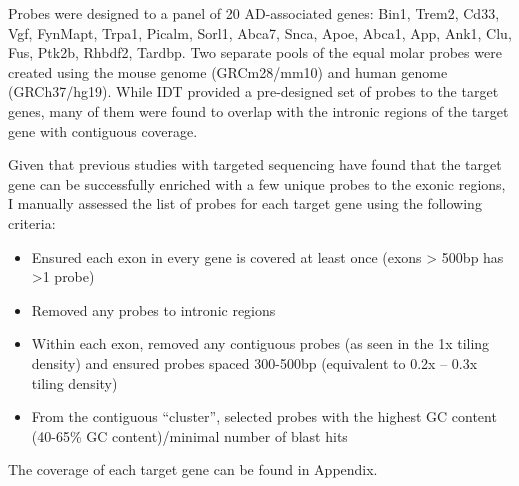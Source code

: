 
Probes were designed to a panel of 20 AD-associated genes: Bin1, Trem2, Cd33, Vgf, FynMapt, Trpa1, Picalm, Sorl1, Abca7, Snca, Apoe, Abca1, App, Ank1, Clu, Fus, Ptk2b, Rhbdf2, Tardbp. Two separate pools of the equal molar probes were created using the mouse genome (GRCm28/mm10) and human genome (GRCh37/hg19). While IDT provided a pre-designed set of probes to the target genes, many of them were found to overlap with the intronic regions of the target gene with contiguous coverage. 

Given that previous studies with targeted sequencing have found that the target gene can be successfully enriched with a few unique probes to the exonic regions, I manually assessed the list of probes for each target gene using the following criteria:
\begin{itemize}
	\item Ensured each exon in every gene is covered at least once (exons > 500bp has >1 probe) 
	\item Removed any probes to intronic regions
	\item Within each exon, removed any contiguous probes (as seen in the 1x tiling density) and ensured probes spaced 300-500bp (equivalent to 0.2x – 0.3x tiling density) 
	\item From the contiguous “cluster”, selected probes with the highest GC content (40-65\% GC content)/minimal number of blast hits 
\end{itemize}
The coverage of each target gene can be found in Appendix. 

